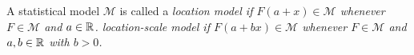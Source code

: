 %
%
%
%
%

\begin{definition}
A statistical model $\mathcal{M}$ is called a
\ben
\it \emph{location model} if $F(a+x)\in\mathcal{M}$ whenever $F\in\mathcal{M}$ and $a\in\mathbb{R}$.
\it \emph{location-scale model} if $F(a+bx)\in\mathcal{M}$ whenever $F\in\mathcal{M}$ and $a,b\in\mathbb{R}$ with $b>0$.
\een
\end{definition}

